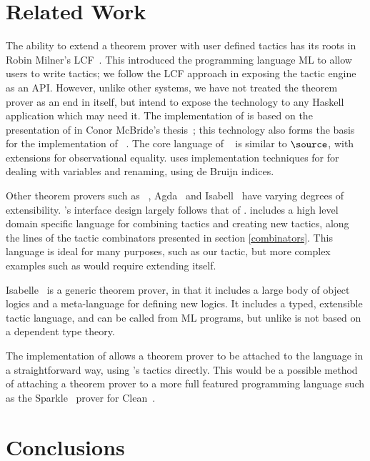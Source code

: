 \section{Related Work}

The ability to extend a theorem prover with user defined tactics has
its roots in Robin Milner's LCF~\cite{lcf-milner}. This introduced the
programming language ML to allow users to write tactics; we follow the
LCF approach in exposing the tactic engine as an API. However, unlike
other systems, we have not treated the theorem prover as an end in
itself, but intend to expose the technology to any Haskell application
which may need it.  The implementation of \Ivor{} is based on the
presentation of \Oleg{} in Conor McBride's
thesis~\cite{mcbride-thesis}; this technology also forms the basis for
the implementation of \Epigram{}~\cite{view-left}. The core language
of \Epigram{}~\cite{epireloaded} is similar to $\source$, with
extensions for observational equality. \Ivor{} uses implementation
techniques for \cite{not-a-number} for dealing with variables and
renaming, using de Bruijn indices.

Other theorem provers such as \Coq{}~\cite{coq-manual},
Agda~\cite{agda} and Isabell~\cite{isabelle} have varying degrees of
extensibility.  \Ivor{}'s interface design largely follows that of
\Coq{}. \Coq{} includes a high level domain specific language for
combining tactics and creating new tactics, along the lines of the
tactic combinators presented in section \ref{combinators}. This
language is ideal for many purposes, such as our 
tactic, but more complex examples such as  would
require extending \Coq{} itself.

Isabelle~\cite{isabelle} is a generic theorem prover, in that it
includes a large body of object logics and a meta-language for
defining new logics. It includes a typed, extensible tactic language,
and can be called from ML programs, but unlike \Ivor{} is not based on
a dependent type theory.

The implementation of \Funl{} allows a theorem prover to be attached
to the language in a straightforward way, using \Ivor{}'s tactics
directly. This would be a possible method of attaching a theorem
prover to a more full featured programming language such as the
Sparkle~\cite{sparkle} prover for Clean~\cite{clean}.

\section{Conclusions}

